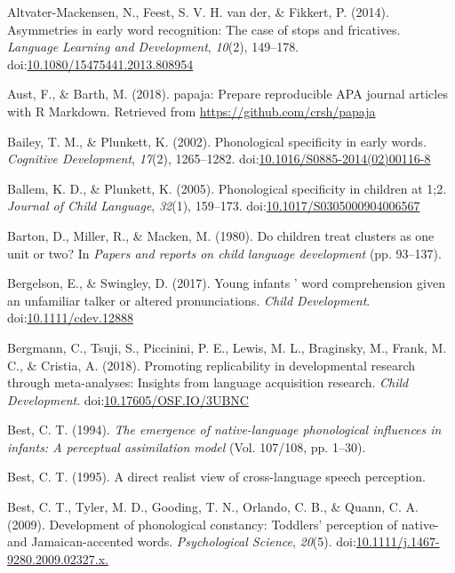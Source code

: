 \documentclass[man]{apa6}
\theoremstyle{definition}
\theoremstyle{definition}
\theoremstyle{definition}
\theoremstyle{remark}
\begin{document}
\hypertarget{ref-Altvater2014}{}
Altvater-Mackensen, N., Feest, S. V. H. van der, \& Fikkert, P. (2014).
Asymmetries in early word recognition: The case of stops and fricatives.
\emph{Language Learning and Development}, \emph{10}(2), 149--178.
doi:\href{https://doi.org/10.1080/15475441.2013.808954}{10.1080/15475441.2013.808954}

\hypertarget{ref-papaja}{}
Aust, F., \& Barth, M. (2018). papaja: Prepare reproducible APA journal
articles with R Markdown. Retrieved from
\url{https://github.com/crsh/papaja}

\hypertarget{ref-Bailey2002}{}
Bailey, T. M., \& Plunkett, K. (2002). Phonological specificity in early
words. \emph{Cognitive Development}, \emph{17}(2), 1265--1282.
doi:\href{https://doi.org/10.1016/S0885-2014(02)00116-8}{10.1016/S0885-2014(02)00116-8}

\hypertarget{ref-Ballem2005}{}
Ballem, K. D., \& Plunkett, K. (2005). Phonological specificity in
children at 1;2. \emph{Journal of Child Language}, \emph{32}(1),
159--173.
doi:\href{https://doi.org/10.1017/S0305000904006567}{10.1017/S0305000904006567}

\hypertarget{ref-Barton1980}{}
Barton, D., Miller, R., \& Macken, M. (1980). Do children treat clusters
as one unit or two? In \emph{Papers and reports on child language
development} (pp. 93--137).

\hypertarget{ref-Bergelson2017}{}
Bergelson, E., \& Swingley, D. (2017). Young infants ' word
comprehension given an unfamiliar talker or altered pronunciations.
\emph{Child Development}.
doi:\href{https://doi.org/10.1111/cdev.12888}{10.1111/cdev.12888}

\hypertarget{ref-Bergmann2018}{}
Bergmann, C., Tsuji, S., Piccinini, P. E., Lewis, M. L., Braginsky, M.,
Frank, M. C., \& Cristia, A. (2018). Promoting replicability in
developmental research through meta-analyses: Insights from language
acquisition research. \emph{Child Development}.
doi:\href{https://doi.org/10.17605/OSF.IO/3UBNC}{10.17605/OSF.IO/3UBNC}

\hypertarget{ref-Best1994}{}
Best, C. T. (1994). \emph{The emergence of native-language phonological
influences in infants: A perceptual assimilation model} (Vol. 107/108,
pp. 1--30).

\hypertarget{ref-Best1995}{}
Best, C. T. (1995). A direct realist view of cross-language speech
perception.

\hypertarget{ref-Best2009}{}
Best, C. T., Tyler, M. D., Gooding, T. N., Orlando, C. B., \& Quann, C.
A. (2009). Development of phonological constancy: Toddlers' perception
of native- and Jamaican-accented words. \emph{Psychological Science},
\emph{20}(5).
doi:\href{https://doi.org/10.1111/j.1467-9280.2009.02327.x.}{10.1111/j.1467-9280.2009.02327.x.}
\end{document}
